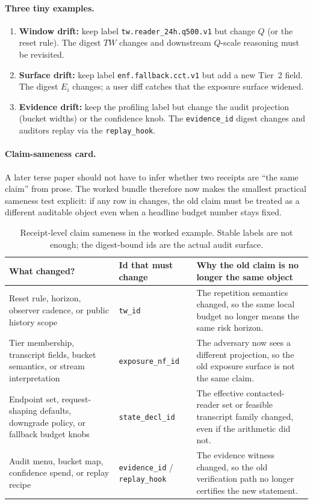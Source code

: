 \documentclass[11pt]{article}
\begin{document}
\paragraph{Three tiny examples.}
\begin{enumerate}[leftmargin=*]
\item \textbf{Window drift:} keep label \texttt{tw.reader\_24h.q500.v1} but change $Q$ (or the reset rule). The digest $TW$ changes and downstream $Q$-scale reasoning must be revisited.\cite{series:threatwindows}
\item \textbf{Surface drift:} keep label \texttt{enf.fallback.cct.v1} but add a new Tier~2 field. The digest $E_i$ changes; a user diff catches that the exposure surface widened.\cite{series:traceifaces}
\item \textbf{Evidence drift:} keep the profiling label but change the audit projection (bucket widths) or the confidence knob. The \texttt{evidence\_id} digest changes and auditors replay via the \texttt{replay\_hook}.\cite{series:receiptitems,series:auditorreplay}
\end{enumerate}

\paragraph{Claim-sameness card.}
A later terse paper should not have to infer whether two receipts are ``the same claim'' from prose.
The worked bundle therefore now makes the smallest practical sameness test explicit: if any row in  changes, the old claim must be treated as a different auditable object even when a headline budget number stays fixed.

\begin{table}[t]
\centering
\small
\begin{tabularx}{\linewidth}{@{}Y Y Y@{}}
\toprule
What changed? & Id that must change & Why the old claim is no longer the same object \\
\midrule
Reset rule, horizon, observer cadence, or public history scope & \texttt{tw\_id} & The repetition semantics changed, so the same local budget no longer means the same risk horizon. \\
Tier membership, transcript fields, bucket semantics, or stream interpretation & \texttt{exposure\_nf\_id} & The adversary now sees a different projection, so the old exposure surface is not the same claim. \\
Endpoint set, request-shaping defaults, downgrade policy, or fallback budget knobs & \texttt{state\_decl\_id} & The effective contacted-reader set or feasible transcript family changed, even if the arithmetic did not. \\
Audit menu, bucket map, confidence spend, or replay recipe & \texttt{evidence\_id} / \texttt{replay\_hook} & The evidence witness changed, so the old verification path no longer certifies the new statement. \\
\bottomrule
\end{tabularx}
\caption{Receipt-level claim sameness in the worked example. Stable labels are not enough; the digest-bound ids are the actual audit surface.}
\label{tab:workedexample-sameness-card}
\end{table}
\end{document}
